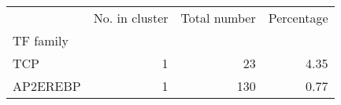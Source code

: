 \begin{tabular}{lrrr}
\toprule
{} &  No. in cluster &  Total number &  Percentage \\
TF family &                 &               &             \\
\midrule
TCP       &               1 &            23 &        4.35 \\
AP2EREBP  &               1 &           130 &        0.77 \\
\bottomrule
\end{tabular}
